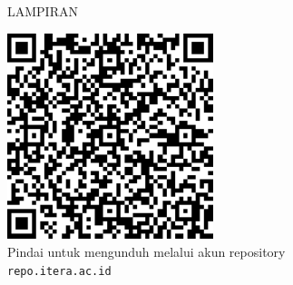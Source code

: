 \begin{center}
    \thispagestyle{empty}
    \vspace*{\fill}
    \noindent \Huge{LAMPIRAN}
\vspace*{\fill}
\end{center}

\clearpage               %
\thispagestyle{empty}    %
\begin{center}
	\vspace*{\fill}      %
	\includegraphics[width=6cm]{gambar/qrcode.png}\\[1em]
	{\large Pindai untuk mengunduh melalui akun repository}\\
	{\small \texttt{repo.itera.ac.id}}
	\vspace*{\fill}
\end{center}